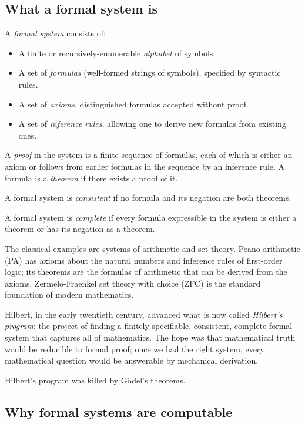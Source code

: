 \subsection{What a formal system is}

\begin{definition}
\label{def:formal-system}
A \emph{formal system} consists of:
\begin{itemize}[leftmargin=2em]
    \item A finite or recursively-enumerable \emph{alphabet} of symbols.
    \item A set of \emph{formulas} (well-formed strings of symbols),
    specified by syntactic rules.
    \item A set of \emph{axioms}, distinguished formulas accepted
    without proof.
    \item A set of \emph{inference rules}, allowing one to derive
    new formulas from existing ones.
\end{itemize}
A \emph{proof} in the system is a finite sequence of formulas, each
of which is either an axiom or follows from earlier formulas in the
sequence by an inference rule. A formula is a \emph{theorem} if there
exists a proof of it.

A formal system is \emph{consistent} if no formula and its
negation are both theorems.

A formal system is \emph{complete} if every formula expressible in
the system is either a theorem or has its negation as a theorem.
\end{definition}

The classical examples are systems of arithmetic and set theory.
Peano arithmetic (PA) has axioms about the natural numbers and
inference rules of first-order logic; its theorems are the formulas
of arithmetic that can be derived from the axioms. Zermelo-Fraenkel
set theory with choice (ZFC) is the standard foundation of modern
mathematics.

Hilbert, in the early twentieth century, advanced what is now called
\emph{Hilbert's program}: the project of finding a finitely-specifiable,
consistent, complete formal system that captures all of mathematics.
The hope was that mathematical truth would be reducible to formal
proof; once we had the right system, every mathematical question
would be answerable by mechanical derivation.

Hilbert's program was killed by G\"odel's theorems.

\subsection{Why formal systems are computable}

